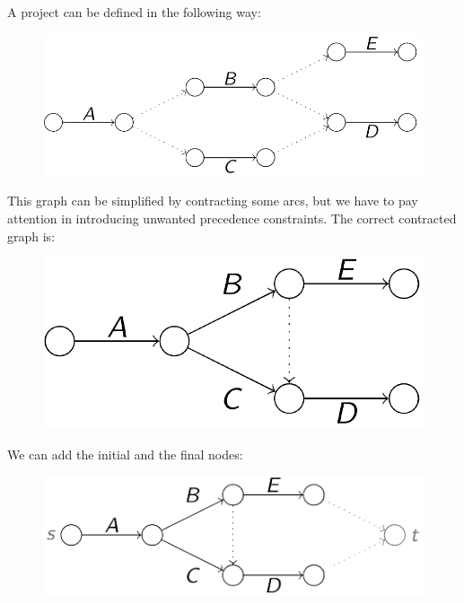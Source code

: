 \documentclass[12pt, a4paper]{report}
\begin{document}
    \begin{example}
        A project can be defined in the following way: 
        \begin{figure}[H]
            \centering
            \includegraphics[width=0.75\linewidth]{images/project.png}
        \end{figure}
        This graph can be simplified by contracting some arcs, but we have to pay attention in introducing unwanted precedence constraints. The correct contracted graph is: 
        \begin{figure}[H]
            \centering
            \includegraphics[width=0.4\linewidth]{images/cproject.png}
        \end{figure}
        We can add the initial and the final nodes: 
        \begin{figure}[H]
            \centering
            \includegraphics[width=0.5\linewidth]{images/fproject.png}
        \end{figure}
    \end{example}
\end{document}
